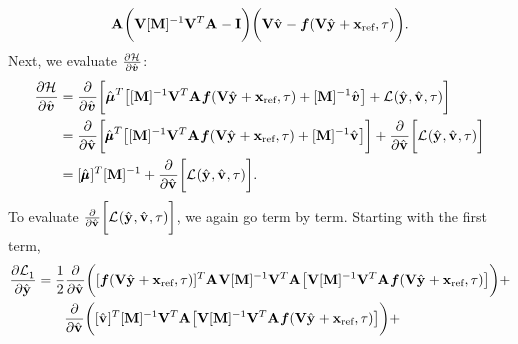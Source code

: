 \documentclass[3p,computermodern,10pt]{elsarticle}
\begin{document}
\begin{appendices}
\begin{equation*}
  \mathbf{A}^{} \bigg(  \mathbf {V}  [\mathbf{M}]^{-1}\mathbf {V}^T  \mathbf{A}^{}- \mathbf{I} \bigg)
 \bigg( \mathbf {V} \hat{\mathbf{v}}^{} - \boldsymbol f(\mathbf {V} \hat{\mathbf{y}}^{} + \mathbf{x}_\text{ref},\tau) \bigg). 
\end{equation*}
Next, we evaluate $\frac{\partial \mathcal{H}^{}}{\partial \hat{\boldsymbol v}^{}}$:
\begin{align*}
  \frac{\partial \mathcal{H}^{}}{\partial \hat{\boldsymbol v}^{}{}} &= \frac{\partial}{\partial \hat{\boldsymbol v}^{}{}} \bigg[  \hat{\boldsymbol \mu}^{T} \big[  [\mathbf{M}]^{-1}\mathbf {V}^T \mathbf{A}^{}\boldsymbol f(\mathbf {V} \hat{\mathbf{y}}^{} + \mathbf{x}_\text{ref},\tau) + [\mathbf{M}]^{-1}\hat{\boldsymbol v}^{} \big] +  \mathcal{L}^{}(\hat{\mathbf{y}}^{},\hat{\mathbf{v}}^{},\tau) \bigg] \\
 &= \frac{\partial}{\partial \hat{\mathbf{v}}^{}{}} \bigg[  \hat{\pmb \mu}^{T} \big[  [\mathbf{M}]^{-1}\mathbf {V}^T \mathbf{A}^{}\boldsymbol f(\mathbf {V} \hat{\mathbf{y}}^{} + \mathbf{x}_\text{ref},\tau) + [\mathbf{M}]^{-1}\hat{\mathbf{v}}^{} \big] \bigg]+  \frac{\partial}{\partial \hat{\mathbf{v}}^{}{}}  \bigg[ \mathcal{L}^{}(\hat{\mathbf{y}}^{},\hat{\mathbf{v}}^{},\tau) \bigg] \\
 &= [\hat{\pmb \mu}^{}]^T[\mathbf{M}]^{-1} + \frac{\partial}{\partial \hat{\mathbf{v}}^{}{}}  \bigg[ \mathcal{L}^{}(\hat{\mathbf{y}}^{},\hat{\mathbf{v}}^{},\tau) \bigg]. 
\end{align*}
To evaluate $\frac{\partial}{\partial \hat{\mathbf{v}}^{}{}}  \bigg[ \mathcal{L}^{}(\hat{\mathbf{y}}^{},\hat{\mathbf{v}}^{},\tau) \bigg]$, we again 
go term by term. Starting with the first term,
\begin{align*}
\frac{\partial  \objectiveControlArg{}_1 }{\partial \genstateyDiscreteArgnt{}{}} &= 
\frac{1}{2} \frac{\partial }{\partial \controllerDiscreteDumArgnt{}} \bigg( [\velocity(\veloargsromy)]^T \stweightingMatArg{} \basisspace [\massArgnt{}]^{-1} \basisspace^T \stweightingMatArg{}  \big[ \basisspace  [\massArgnt{}]^{-1}\basisspace^T
\stweightingMatArg{}  \velocity(\veloargsromy) \big] \bigg) + \\
& \qquad \frac{\partial }{\partial \controllerDiscreteDumArgnt{}{}} \bigg( [\controllerDiscreteDumArgnt{}]^T [\massArgnt{}]^{-1} \basisspace^T \stweightingMatArg{}  \big[ \basisspace  [\massArgnt{}]^{-1}\basisspace^T
\stweightingMatArg{}  \velocity(\veloargsromy) \big] \bigg) + \\

\end{align*}
\end{appendices}
\end{document}
